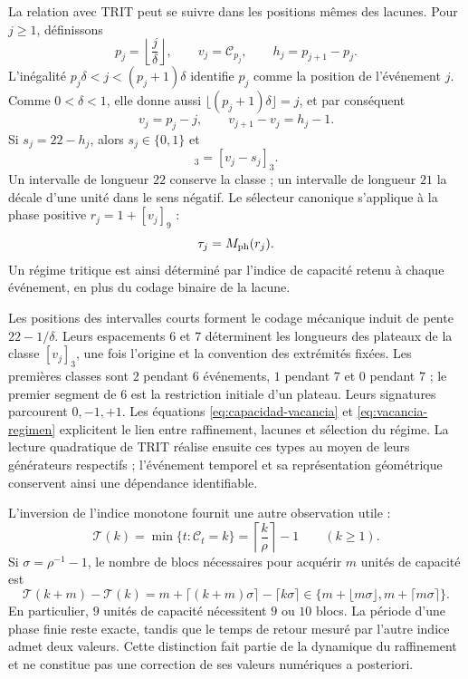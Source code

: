 La relation avec TRIT peut se suivre dans les positions mêmes des lacunes.
Pour \(j\geq1\), définissons
\[
 p_j=\left\lfloor\frac j\delta\right\rfloor,\qquad
 v_j=\mathcal C_{p_j},\qquad h_j=p_{j+1}-p_j.
\]
L'inégalité \(p_j\delta<j<(p_j+1)\delta\) identifie \(p_j\)
comme la position de l'événement \(j\). Comme \(0<\delta<1\), elle donne aussi
\(\lfloor(p_j+1)\delta\rfloor=j\), et par conséquent
\[
 v_j=p_j-j,\qquad
 v_{j+1}-v_j=h_j-1.
\]
Si \(s_j=22-h_j\), alors \(s_j\in\{0,1\}\) et
\begin{equation}
 [v_{j+1}]_3=[v_j-s_j]_3.
 \label{eq:vacancia-regimen}
\end{equation}
Un intervalle de longueur \(22\) conserve la classe ; un intervalle de longueur
\(21\) la décale d'une unité dans le sens négatif. Le sélecteur canonique
s'applique à la phase positive \(r_j=1+[v_j]_9\) :
\[
 \tau_j=M_{\rm ph}(r_j).
\]
Un régime tritique est ainsi déterminé par l'indice de capacité
retenu à chaque événement, en plus du codage binaire de la lacune.

Les positions des intervalles courts forment le codage mécanique
induit de pente \(22-1/\delta\). Leurs espacements \(6\) et \(7\)
déterminent les longueurs des plateaux de la classe \([v_j]_3\), une
fois l'origine et la convention des extrémités fixées. Les premières classes
sont \(2\) pendant \(6\) événements, \(1\) pendant \(7\) et \(0\) pendant
\(7\) ; le premier segment de \(6\) est la restriction initiale d'un plateau.
Leurs signatures parcourent \(0,-1,+1\). Les équations
\eqref{eq:capacidad-vacancia} et \eqref{eq:vacancia-regimen} explicitent le
lien entre raffinement, lacunes et sélection du régime. La lecture
quadratique de TRIT réalise ensuite ces types au moyen de leurs générateurs
respectifs ; l'événement temporel et sa représentation géométrique
conservent ainsi une dépendance identifiable.

L'inversion de l'indice monotone fournit une autre observation utile :
\[
 \mathcal T(k)=\min\{t:\mathcal C_t=k\}
   =\left\lceil\frac k\rho\right\rceil-1\qquad(k\geq1).
\]
Si \(\sigma=\rho^{-1}-1\), le nombre de blocs nécessaires pour acquérir
\(m\) unités de capacité est
\[
 \mathcal T(k+m)-\mathcal T(k)
 =m+\lceil(k+m)\sigma\rceil-\lceil k\sigma\rceil
 \in\{m+\lfloor m\sigma\rfloor,m+\lceil m\sigma\rceil\}.
\]
En particulier, \(9\) unités de capacité nécessitent \(9\) ou \(10\)
blocs. La période d'une phase finie reste exacte, tandis que le
temps de retour mesuré par l'autre indice admet deux valeurs. Cette
distinction fait partie de la dynamique du raffinement et ne constitue pas une correction
de ses valeurs numériques a posteriori.
